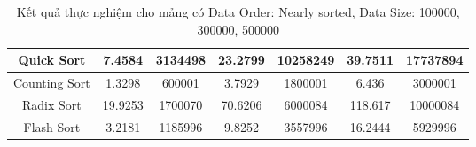 \begin{table}[H]
{\begin{tabular}{|ccccccc|}
\multicolumn{1}{|c|}{Quick Sort} & \multicolumn{1}{c|}{7.4584} & \multicolumn{1}{c|}{3134498} & \multicolumn{1}{c|}{23.2799} & \multicolumn{1}{c|}{10258249} & \multicolumn{1}{c|}{39.7511} & \multicolumn{1}{c|}{17737894} \\ \hline
\multicolumn{1}{|c|}{Counting Sort} & \multicolumn{1}{c|}{1.3298} & \multicolumn{1}{c|}{600001} & \multicolumn{1}{c|}{3.7929} & \multicolumn{1}{c|}{1800001} & \multicolumn{1}{c|}{6.436} & \multicolumn{1}{c|}{3000001} \\ \hline
\multicolumn{1}{|c|}{Radix Sort} & \multicolumn{1}{c|}{19.9253} & \multicolumn{1}{c|}{1700070} & \multicolumn{1}{c|}{70.6206} & \multicolumn{1}{c|}{6000084} & \multicolumn{1}{c|}{118.617} & \multicolumn{1}{c|}{10000084} \\ \hline
\multicolumn{1}{|c|}{Flash Sort} & \multicolumn{1}{c|}{3.2181} & \multicolumn{1}{c|}{1185996} & \multicolumn{1}{c|}{9.8252} & \multicolumn{1}{c|}{3557996} & \multicolumn{1}{c|}{16.2444} & \multicolumn{1}{c|}{5929996} \\ \hline
\end{tabular}%
}
\caption{Kết quả thực nghiệm cho mảng có Data Order: Nearly sorted, Data Size: 100000, 300000, 500000}
\label{tab:nearly_sorted_100000_300000_500000}
\end{table}

